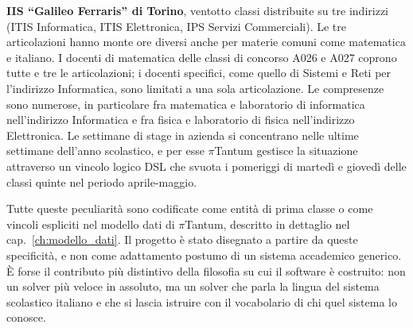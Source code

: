 \begin{casostudiobox}
\textbf{IIS ``Galileo Ferraris'' di Torino}, ventotto classi
distribuite su tre indirizzi (ITIS Informatica, ITIS
Elettronica, IPS Servizi Commerciali). Le tre articolazioni
hanno monte ore diversi anche per materie comuni come
matematica e italiano. I docenti di matematica delle classi
di concorso A026 e A027 coprono tutte e tre le articolazioni;
i docenti specifici, come quello di Sistemi e Reti per
l'indirizzo Informatica, sono limitati a una sola
articolazione. Le compresenze sono numerose, in particolare
fra matematica e laboratorio di informatica nell'indirizzo
Informatica e fra fisica e laboratorio di fisica
nell'indirizzo Elettronica. Le settimane di stage in azienda
si concentrano nelle ultime settimane dell'anno scolastico,
e per esse $\pi$Tantum gestisce la situazione attraverso un
vincolo logico DSL che svuota i pomeriggi di marted\`i e
gioved\`i delle classi quinte nel periodo aprile-maggio.
\end{casostudiobox}

Tutte queste peculiarit\`a sono codificate come entit\`a di
prima classe o come vincoli espliciti nel modello dati di
$\pi$Tantum, descritto in dettaglio nel
cap.~\ref{ch:modello_dati}. Il progetto \`e stato disegnato
a partire da queste specificit\`a, e non come adattamento
postumo di un sistema accademico generico. \`E forse il
contributo pi\`u distintivo della filosofia su cui il
software \`e costruito: non un solver pi\`u veloce in
assoluto, ma un solver che parla la lingua del sistema
scolastico italiano e che si lascia istruire con il
vocabolario di chi quel sistema lo conosce.

